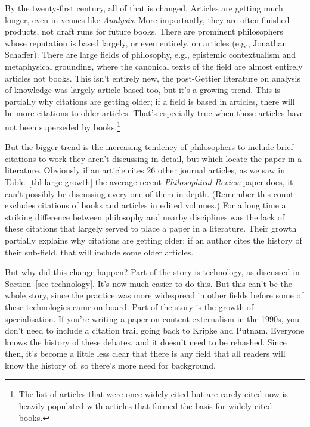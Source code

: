 \documentclass[
  12pt,
  letterpaper,
  DIV=11,
  numbers=noendperiod]{scrartcl}
\begin{document}
By the twenty-first century, all of that is changed. Articles are
getting much longer, even in venues like \emph{Analysis}. More
importantly, they are often finished products, not draft runs for future
books. There are prominent philosophers whose reputation is based
largely, or even entirely, on articles (e.g., Jonathan Schaffer). There
are large fields of philosophy, e.g., epistemic contextualism and
metaphysical grounding, where the canonical texts of the field are
almost entirely articles not books. This isn't entirely new, the
post-Gettier literature on analysis of knowledge was largely
article-based too, but it's a growing trend. This is partially why
citations are getting older; if a field is based in articles, there will
be more citations to older articles. That's especially true when those
articles have not been superseded by books.\footnote{The list of
  articles that were once widely cited but are rarely cited now is
  heavily populated with articles that formed the basis for widely cited
  books.}

But the bigger trend is the increasing tendency of philosophers to
include brief citations to work they aren't discussing in detail, but
which locate the paper in a literature. Obviously if an article cites 26
other journal articles, as we saw in Table~\ref{tbl-large-growth} the
average recent \emph{Philosophical Review} paper does, it can't possibly
be discussing every one of them in depth. (Remember this count excludes
citations of books and articles in edited volumes.) For a long time a
striking difference between philosophy and nearby disciplines was the
lack of these citations that largely served to place a paper in a
literature. Their growth partially explains why citations are getting
older; if an author cites the history of their sub-field, that will
include some older articles.

But why did this change happen? Part of the story is technology, as
discussed in Section~\ref{sec-technology}. It's now much easier to do
this. But this can't be the whole story, since the practice was more
widespread in other fields before some of these technologies came on
board. Part of the story is the growth of specialisation. If you're
writing a paper on content externalism in the 1990s, you don't need to
include a citation trail going back to Kripke and Putnam. Everyone knows
the history of these debates, and it doesn't need to be rehashed. Since
then, it's become a little less clear that there is any field that all
readers will know the history of, so there's more need for background.
\end{document}
